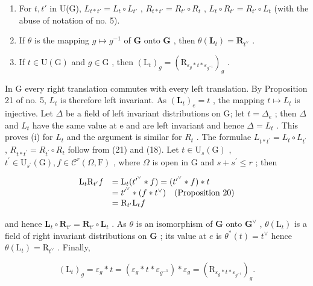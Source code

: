 \begin{enumerate}
\def\labelenumi{(\roman{enumi})}
\setcounter{enumi}{1}
\item
  For \(t, t'\) in U(G), \(L_{t*t'} = L_t \circ L_{t'}\) , \(R_{t*t'} = R_{t'} \circ R_t\) , \(L_t \circ R_{t'} = R_{t'} \circ L_t\) (with the abuse of notation of no. 5).
\item
  If \(\theta\) is the mapping \(g \mapsto g^{-1}\) of \(\mathbf{G}\) onto \(\mathbf{G}\) , then \(\theta(\mathbf{L}_t) = \mathbf{R}_{t^{\vee}}\) .
\item
  If \(t \in \mathrm{U}(\mathrm{G})\) and \(g \in \mathrm{G}\) , then \((\mathrm{L}_t)_g = (\mathrm{R}_{\varepsilon_g * t * \varepsilon_{g^{-1}}})_g\) .
\end{enumerate}

In G every right translation commutes with every left translation. By Proposition 21 of no. 5, \(L_{t}\) is therefore left invariant. As \((\mathbf{L}_{t})_{e}=t\) , the mapping \(t\mapsto L_{t}\) is injective. Let \(\Delta\) be a field of left invariant distributions on G; let \(t=\Delta_{e}\) ; then \(\Delta\) and \(L_{t}\) have the same value at e and are left invariant and hence \(\Delta=L_{t}\) . This proves (i) for \(L_{t}\) and the argument is similar for \(R_{t}\) . The formulae \(L_{t*t^{\prime}}=L_{t}\circ L_{t^{\prime}}\) , \(R_{t*t^{\prime}}=R_{t^{\prime}}\circ R_{t}\) follow from (21) and (18). Let \(t\in\mathrm{U}_{s}(\mathrm{G})\) , \(t^{\prime}\in\mathrm{U}_{s^{\prime}}(\mathrm{G}), f\in\mathcal{C}^{r}(\Omega,\mathrm{F})\) , where \(\Omega\) is open in G and \(s+s^{\prime}\leqslant r\) ; then

\[
\begin{array}{r l} \mathrm{L} _ {t} \mathrm{R} _ {t ^ {\prime}} f & = \mathrm{L} _ {t} (t ^ {\prime^ {\vee}} * f) = (t ^ {\prime^ {\vee}} * f) * t \\ & = t ^ {\prime^ {\vee}} * (f * t ^ {\vee}) \quad \text {(Proposition 20)} \\ & = \mathrm{R} _ {t ^ {\prime}} \mathrm{L} _ {t} f \end{array}
\]

and hence \(\mathbf{L}_t\circ \mathbf{R}_{t'} = \mathbf{R}_{t'}\circ \mathbf{L}_t\) . As \(\theta\) is an isomorphism of \(\mathbf{G}\) onto \(\mathbf{G}^{\vee}\) , \(\theta (\mathrm{L}_t)\) is a field of right invariant distributions on \(\mathbf{G}\) ; its value at \(e\) is \(\theta^{*}(t) = t^{\vee}\) hence \(\theta (\mathrm{L}_t) = \mathrm{R}_{t^{\vee}}\) . Finally,

\[
\left(\mathrm{L} _ {t}\right) _ {g} = \varepsilon_ {g} * t = \left(\varepsilon_ {g} * t * \varepsilon_ {g^{-1}}\right) * \varepsilon_ {g} = \left(\mathrm{R} _ {\varepsilon_ {g} * t * \varepsilon_ {g^{-1}}}\right) _ {g}.
\]

